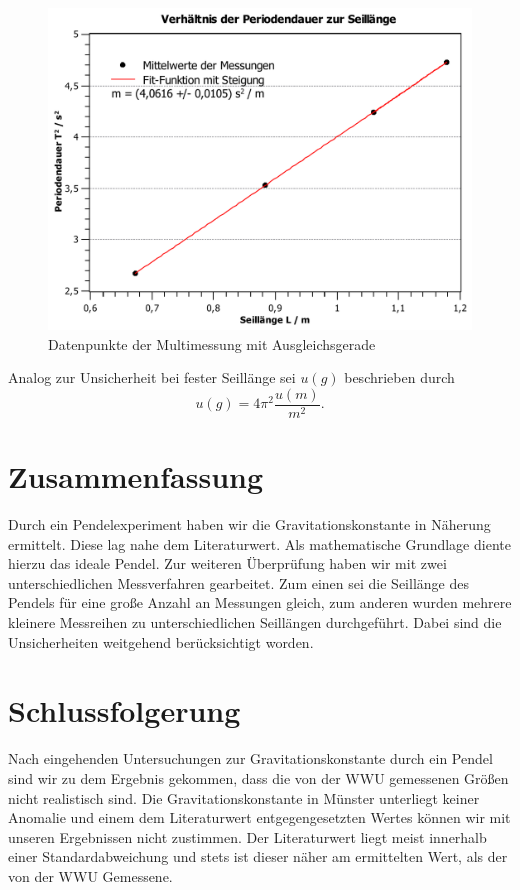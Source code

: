 \documentclass[11pt,a4paper,titlepage, ngerman]{article}
\begin{document}
		\begin{figure}
			\centering
			\includegraphics[width=\textwidth]{SteigungMultimessung.pdf}
			\caption{Datenpunkte der Multimessung mit Ausgleichsgerade}
			\label{fig:multi}
		\end{figure}
		
		Analog zur Unsicherheit bei fester Seillänge sei $u(g)$ beschrieben durch
		\begin{equation*}
			u(g) = 4\pi^2 \frac{u(m)}{m^2}.
		\end{equation*}
		
	\section{Zusammenfassung}
		Durch ein Pendelexperiment haben wir die Gravitationskonstante in Näherung ermittelt.
		Diese lag nahe dem Literaturwert.
		Als mathematische Grundlage diente hierzu das ideale Pendel.
		Zur weiteren Überprüfung haben wir mit zwei unterschiedlichen Messverfahren gearbeitet.
		Zum einen sei die Seillänge des Pendels für eine große Anzahl an Messungen gleich, zum anderen wurden mehrere kleinere Messreihen zu unterschiedlichen Seillängen durchgeführt.
		Dabei sind die Unsicherheiten weitgehend berücksichtigt worden.
		
		
	\section{Schlussfolgerung}
		Nach eingehenden Untersuchungen zur Gravitationskonstante durch ein Pendel sind wir zu dem Ergebnis gekommen, dass die von der WWU gemessenen Größen nicht realistisch sind.
		Die Gravitationskonstante in Münster unterliegt keiner Anomalie und einem dem Literaturwert entgegengesetzten Wertes können wir mit unseren Ergebnissen nicht zustimmen.
		Der Literaturwert liegt meist innerhalb einer Standardabweichung und stets ist dieser näher am ermittelten Wert, als der von der WWU Gemessene.
		
\end{document}
